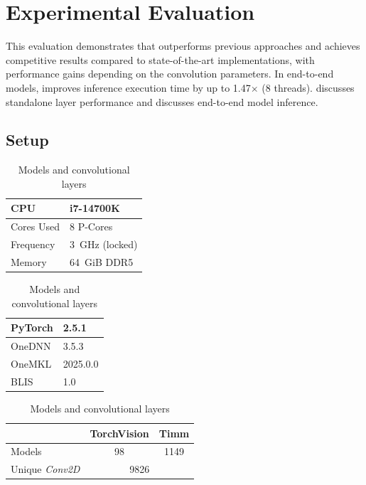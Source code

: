\section{Experimental Evaluation}
\label{sec:evaluation}

This evaluation demonstrates that \algname outperforms previous approaches and achieves competitive results compared to state-of-the-art implementations, with performance gains depending on the convolution parameters.
In end-to-end models, \algname improves inference execution time by up to 1.47$\times$ (8 threads).  discusses standalone layer performance and  discusses end-to-end model inference.

\subsection{Setup}
\label{sec:setup}

\begin{table}
    \centering
    \begin{minipage}{0.3\linewidth}
        \caption{Experimental configuration}
        \label{tab:specs}
        \small
        \centering
        \begin{tabular}{l|l}
        CPU              & i7-14700K       \\ \hline
        Cores Used       & 8 P-Cores       \\ \hline
        Frequency        & \SI{3}{GHz} (locked) \\ \hline
        Memory           & \SI{64}{GiB} DDR5
        \end{tabular}
    \end{minipage}
    \hfill
    \begin{minipage}{0.28\linewidth}
        \caption{Software versions}
        \label{tab:version}
        \small
        \centering
        \begin{tabular}{l|l}
        PyTorch          & 2.5.1     \\ \hline
        OneDNN           & 3.5.3     \\ \hline
        OneMKL           & 2025.0.0  \\ \hline
        BLIS             & 1.0
        \end{tabular}
    \end{minipage}
      \begin{minipage}{0.40\linewidth}
        \caption{Models and convolutional layers}
        \label{tab:models}
        \small
        \centering
        \begin{tabular}{l|c|c|}
                             & TorchVision & Timm \\ \hline
        Models               & 98          & 1149 \\
        Unique \emph{Conv2D} & \multicolumn{2}{c|}{9826} \\
        \end{tabular}
    \end{minipage}
\end{table}

